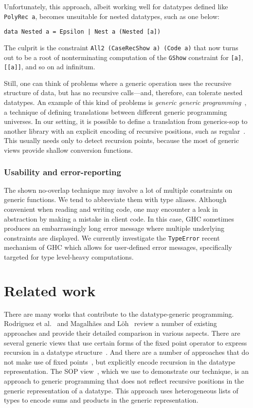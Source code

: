 \documentclass[runningheads]{llncs}
\newcommand{\K}[1]{\lstinline[style=fancy]{#1}}
\begin{document}
Unfortunately, this approach, albeit working well for datatypes defined like \K{PolyRec a}, becomes unsuitable for nested datatypes, such as one below:
\begin{lstlisting}[style=fancy]
data Nested a = Epsilon | Nest a (Nested [a])
\end{lstlisting}
The culprit is the constraint \K{All2 (CaseRecShow a) (Code a)} that now turns out to be a root of nonterminating computation of the \K{GShow} constraint for \K{[a]}, \K{[[a]]}, and so on ad infinitum.

Still, one can think of problems where a generic operation uses the recursive structure of data, but has no recursive calls---and, therefore, can tolerate nested datatypes. An example of this kind of problems is \emph{generic generic programming}~\cite{MagLoeh2014}, a technique of defining translations between different generic programming universes. In our setting, it is possible to define a translation from \textsf{generics-sop} to another library with an explicit encoding of recursive positions, such as \textsf{regular}~\cite{VanNoort2008}. This usually needs only to detect recursion points, because the most of generic views provide shallow conversion functions.

\subsubsection{Usability and error-reporting}

The shown no-overlap technique may involve a lot of multiple constraints on generic functions. We tend to abbreviate them with type aliases. Although convenient when reading and writing code, one may encounter a leak in abstraction by making a mistake in client code. In this case, GHC sometimes produces an embarrassingly long error message where multiple underlying constraints are displayed. We currently investigate the \K{TypeError} recent mechanism of GHC which allows for user-defined error messages, specifically targeted for type level-heavy computations.

\section{Related work}
\label{sec:related-work}

There are many works that contribute to the datatype-generic programming. Rodriguez et al.~\cite{Rodriguez2008} and Magalh{\~{a}}es and L{\"{o}}h~\cite{MagLoeh2012} review a number of existing approaches and provide their detailed comparison in various aspects. There are several generic views that use certain forms of the fixed point operator to express recursion in a datatype structure~\cite{VanNoort2008,MuRec2009,Jansson1997,Loeh2011}. And there are a number of approaches that do not make use of fixed points~\cite{Chakravarty2009,Cheney2002,Magalhaes2010,Weirich2006}, but explicitly encode recursion in the datatype representation. The SOP view~\cite{VriLoeh2014}, which we use to demonstrate our technique, is an approach to generic programming that does not reflect recursive positions in the generic representation of a datatype. This approach uses heterogeneous lists of types to encode sums and products in the generic representation.
\end{document}
